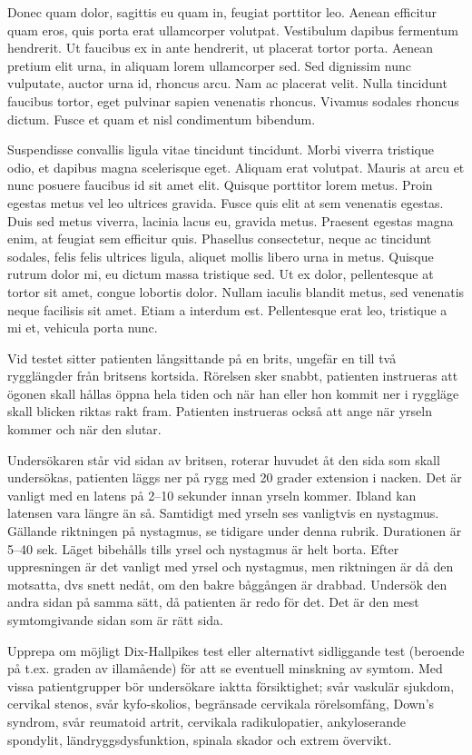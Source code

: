 Donec quam dolor, sagittis eu quam in, feugiat porttitor leo. Aenean efficitur quam eros, quis porta erat ullamcorper volutpat. Vestibulum dapibus fermentum hendrerit. Ut faucibus ex in ante hendrerit, ut placerat tortor porta. Aenean pretium elit urna, in aliquam lorem ullamcorper sed. Sed dignissim nunc vulputate, auctor urna id, rhoncus arcu. Nam ac placerat velit. Nulla tincidunt faucibus tortor, eget pulvinar sapien venenatis rhoncus. Vivamus sodales rhoncus dictum. Fusce et quam et nisl condimentum bibendum.

Suspendisse convallis ligula vitae tincidunt tincidunt. Morbi viverra tristique odio, et dapibus magna scelerisque eget. Aliquam erat volutpat. Mauris at arcu et nunc posuere faucibus id sit amet elit. Quisque porttitor lorem metus. Proin egestas metus vel leo ultrices gravida. Fusce quis elit at sem venenatis egestas. Duis sed metus viverra, lacinia lacus eu, gravida metus. Praesent egestas magna enim, at feugiat sem efficitur quis. Phasellus consectetur, neque ac tincidunt sodales, felis felis ultrices ligula, aliquet mollis libero urna in metus. Quisque rutrum dolor mi, eu dictum massa tristique sed. Ut ex dolor, pellentesque at tortor sit amet, congue lobortis dolor. Nullam iaculis blandit metus, sed venenatis neque facilisis sit amet. Etiam a interdum est. Pellentesque erat leo, tristique a mi et, vehicula porta nunc. 

Vid testet sitter patienten långsittande på en brits, ungefär en till två rygglängder från britsens kortsida. Rörelsen sker snabbt, patienten instrueras att ögonen skall hållas öppna hela tiden och när han eller hon kommit ner i ryggläge skall blicken riktas rakt fram. Patienten instrueras också att ange när yrseln kommer och när den slutar.

Undersökaren står vid sidan av britsen, roterar huvudet åt den sida som skall undersökas, patienten läggs ner på rygg med 20 grader extension i nacken. Det är vanligt med en latens på 2–10 sekunder innan yrseln kommer. Ibland kan latensen vara längre än så. 
Samtidigt med yrseln ses vanligtvis en nystagmus. Gällande riktningen på nystagmus, se tidigare under denna rubrik. Durationen är 5–40 sek. Läget bibehålls tills yrsel och nystagmus är helt borta. Efter uppresningen är det vanligt med yrsel och nystagmus, men riktningen är då den motsatta, dvs snett nedåt, om den bakre båggången är drabbad. Undersök den andra sidan på samma sätt, då patienten är redo för det. 
Det är den mest symtomgivande sidan som är rätt sida. 

Upprepa om möjligt Dix-Hallpikes test eller alternativt sidliggande test (beroende på t.ex. graden av illamående) för att se eventuell minskning av symtom. Med vissa patientgrupper bör undersökare iaktta försiktighet; svår vaskulär sjukdom, cervikal stenos, svår kyfo-skolios, begränsade cervikala rörelsomfång, Down’s syndrom, svår reumatoid artrit, cervikala radikulopatier, ankyloserande spondylit, ländryggsdysfunktion, spinala skador och extrem övervikt.

